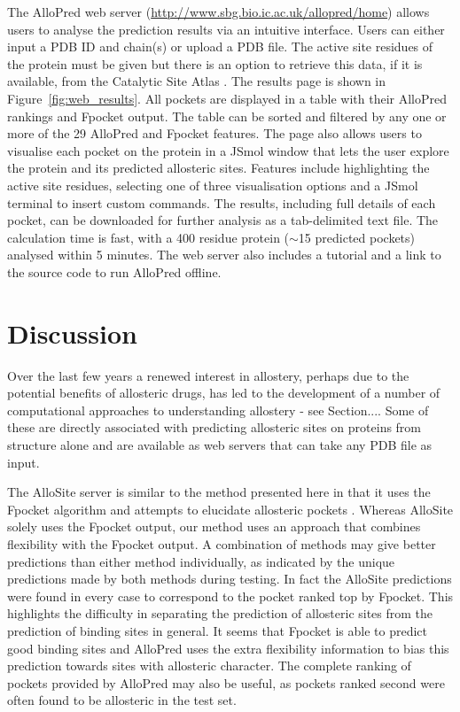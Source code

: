 The AlloPred web server (\url{http://www.sbg.bio.ic.ac.uk/allopred/home}) allows users to analyse the prediction results via an intuitive interface.
Users can either input a PDB ID and chain(s) or upload a PDB file.
The active site residues of the protein must be given but there is an option to retrieve this data, if it is available, from the Catalytic Site Atlas \cite{Furnham2014}.
The results page is shown in Figure~\ref{fig:web_results}.
All pockets are displayed in a table with their AlloPred rankings and Fpocket output.
The table can be sorted and filtered by any one or more of the 29 AlloPred and Fpocket features.
The page also allows users to visualise each pocket on the protein in a JSmol window that lets the user explore the protein and its predicted allosteric sites.
Features include highlighting the active site residues, selecting one of three visualisation options and a JSmol terminal to insert custom commands.
The results, including full details of each pocket, can be downloaded for further analysis as a tab-delimited text file.
The calculation time is fast, with a 400 residue protein ($\sim$15 predicted pockets) analysed within 5 minutes.
The web server also includes a tutorial and a link to the source code to run AlloPred offline.


\section{Discussion}

Over the last few years a renewed interest in allostery, perhaps due to the potential benefits of allosteric drugs, has led to the development of a number of computational approaches to understanding allostery - see Section....
Some of these are directly associated with predicting allosteric sites on proteins from structure alone and are available as web servers that can take any PDB file as input.

The AlloSite server is similar to the method presented here in that it uses the Fpocket algorithm and attempts to elucidate allosteric pockets \cite{Huang2013}.
Whereas AlloSite solely uses the Fpocket output, our method uses an approach that combines flexibility with the Fpocket output.
A combination of methods may give better predictions than either method individually, as indicated by the unique predictions made by both methods during testing.
In fact the AlloSite predictions were found in every case to correspond to the pocket ranked top by Fpocket.
This highlights the difficulty in separating the prediction of allosteric sites from the prediction of binding sites in general.
It seems that Fpocket is able to predict good binding sites and AlloPred uses the extra flexibility information to bias this prediction towards sites with allosteric character.
The complete ranking of pockets provided by AlloPred may also be useful, as pockets ranked second were often found to be allosteric in the test set.


